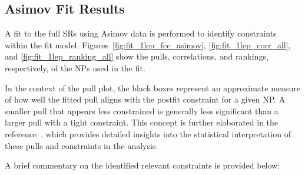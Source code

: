 
\clearpage
\subsection{Asimov Fit Results}

A fit to the full SRs using Asimov data is performed to identify constraints within the fit model. 
Figures~\ref{fig:fit_1lep_fcc_asimov}, \ref{fig:fit_1lep_corr_all}, and \ref{fig:fit_1lep_ranking_all} show the pulls, correlations, and rankings, respectively, of the NPs used in the fit.

In the context of the pull plot, the black boxes represent an approximate measure of how well the fitted pull aligns with the postfit constraint for a given NP. A smaller pull that appears less constrained is generally less significant than a larger pull with a tight constraint. This concept is further elaborated in the reference~\cite{morange:tel-03341303}, which provides detailed insights into the statistical interpretation of these pulls and constraints in the analysis.

A brief commentary on the identified relevant constraints is provided below:


